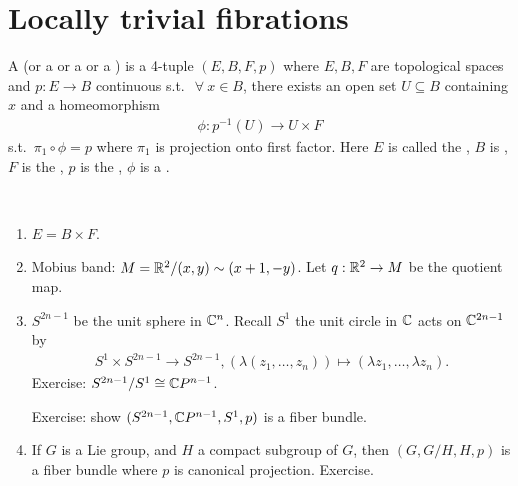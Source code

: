 \documentclass[12pt,class=article,crop=false]{standalone}
\begin{document}
\section{Locally trivial fibrations}
\begin{defn}
A  (or a  or a  or a ) is a 4-tuple $ (E,B,F,p)$ where $ E,B,F$ are topological spaces and  $ p: E \to B$ continuous s.t.\ $ \ \forall \ x \in B$, there exists an open set $ U \subseteq B$ containing $ x$ and a homeomorphism
 \begin{align*}
	\phi: p^{-1}(U) \to U \times F
\end{align*}
s.t.\ $ \pi_1 \circ \phi = p$ where $ \pi_1$ is projection onto first factor. Here $ E$ is called the  , $ B$ is  , $ F$ is the  , $ p$ is the  , $ \phi$ is a .     
\end{defn}
\begin{eg}
~\begin{enumerate}[label=(\arabic*)]
	\item $ E=B \times F$.
	\item Mobius band: $ M= \mathbb{R}^2 / (x,y) \sim (x+1,-y)$. Let $ q: \mathbb{R}^2 \to M$ be the quotient map.
	\item $ S^{2n-1}$ be the unit sphere in $ \mathbb{C}^{n}$. Recall $ S^{1}$ the unit circle in $ \mathbb{C}$ acts on $ \mathbb{C}^{2n-1}$ by
		\begin{align*}
			S^{1} \times S^{2n-1} \to S^{2n-1}, (\lambda (z_1,\ldots,z_n)) \mapsto (\lambda z_1,\ldots,\lambda z_n).
		\end{align*}
		Exercise: $ S^{2n-1} / S^{1} \cong \mathbb{C} P^{n-1}$.

		Exercise: show $ (S^{2n-1}, \mathbb{C} P^{n-1}, S^{1},p)$ is a fiber bundle.
	\item If $ G$ is a Lie group, and $ H$ a compact subgroup of  $ G$, then  $ (G,G /H,H,p)$ is a fiber bundle where $ p$ is canonical projection. Exercise.
\end{enumerate}
\end{eg}
\end{document}
